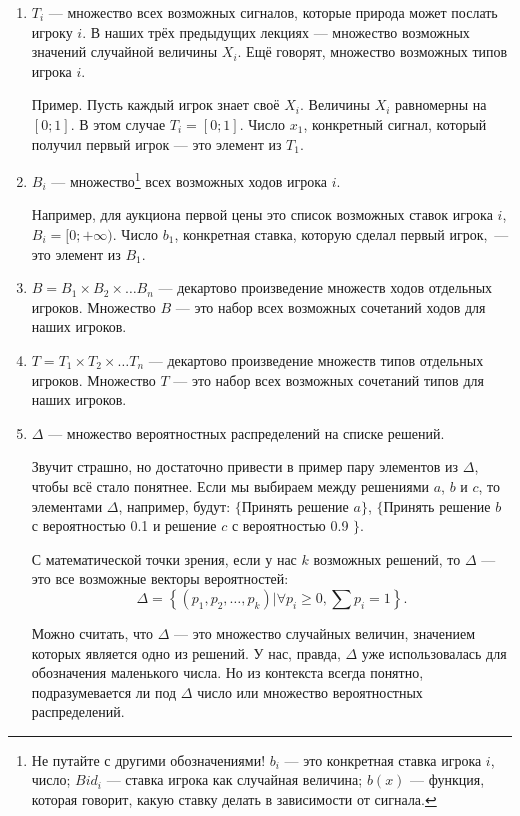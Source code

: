 \begin{enumerate}
\item $ T_{i} $ — множество всех возможных сигналов, которые природа может послать игроку $ i $. В наших трёх предыдущих лекциях — множество возможных значений случайной величины $ X_{i} $. Ещё говорят, множество возможных типов игрока $ i $.

Пример. Пусть каждый игрок знает своё $ X_{i} $. Величины $ X_{i}  $ равномерны на $ [0;1] $. В этом случае $ T_{i}=[0;1] $. Число $ x_{1} $, конкретный сигнал, который получил первый игрок — это элемент из $ T_{1} $.
\item $ B_{i} $ — множество\footnote{Не путайте с другими обозначениями! $ b_{i} $ — это конкретная ставка игрока $ i $, число; $ Bid_{i} $ — ставка игрока как случайная величина; $ b(x) $ — функция, которая говорит, какую ставку делать в зависимости от сигнала.}  всех возможных ходов игрока $ i $.

Например, для аукциона первой цены это список возможных ставок игрока $ i $, $ B_{i}=[0;+\infty) $. Число $ b_{1} $, конкретная ставка, которую сделал первый игрок,~— это элемент из $ B_{1} $.

\item $ B=B_{1}\times B_{2}\times \ldots B_{n} $ — декартово произведение множеств ходов отдельных игроков. Множество $B$ — это набор всех возможных сочетаний ходов для наших игроков.

\item $ T=T_{1}\times T_{2}\times \ldots T_{n} $ — декартово произведение множеств типов отдельных игроков. Множество $T$ — это набор всех возможных сочетаний типов для наших игроков.

\item $ \Delta $ — множество вероятностных распределений на списке решений.

Звучит страшно, но достаточно привести в пример пару элементов из $ \Delta $, чтобы всё стало понятнее. Если мы выбираем между решениями $ a $, $ b $ и $ c $, то элементами $ \Delta $, например, будут: $ \{ $Принять решение $ a\} $, $ \{ $Принять решение $ b $ с вероятностью 0.1 и решение $c$ с вероятностью 0.9 $ \}$.

С математической точки зрения, если у нас $ k $ возможных решений, то $ \Delta $ — это все возможные векторы вероятностей:
\begin{equation}
\Delta=\left\{(p_{1},p_{2},\ldots,p_{k})|\forall p_{i}\geq 0, \sum p_{i}=1 \right\}.
\end{equation}

Можно считать, что $ \Delta $ — это множество случайных величин, значением которых является одно из решений.
У нас, правда, $ \Delta $ уже использовалась для обозначения маленького числа. Но из контекста всегда понятно, подразумевается ли под $ \Delta $ число или множество вероятностных распределений.

\end{enumerate}

